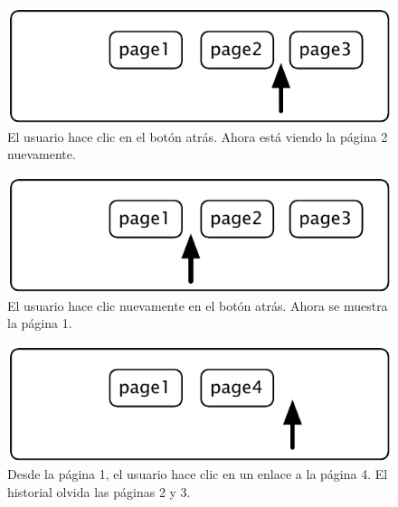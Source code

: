 \documentclass[a4paper,10pt,twoside]{book}
\begin{document}
{\begin{figure}[!ht]
\centerline{\includegraphics[scale=0.5]{page2_Stef}}
\caption{El usuario hace clic en el bot\'on atr\'as. Ahora est\'a viendo la p\'agina 2 nuevamente.}
\vspace{.2in}
\end{figure}

\begin{figure}[!ht]
\centerline{\includegraphics[scale=0.5]{page1_Stef}}
\caption{El usuario hace clic nuevamente en el bot\'on atr\'as. Ahora se muestra la p\'agina 1.}
\vspace{.2in}
\end{figure}

\begin{figure}[!ht]
\centerline{\includegraphics[scale=0.5]{page4Stef}}
\caption{Desde la p\'agina 1, el usuario hace clic en un enlace a la p\'agina 4. El historial olvida las p\'aginas 2 y 3.}
\vspace{.2in}
\end{figure}

}
\end{document}
